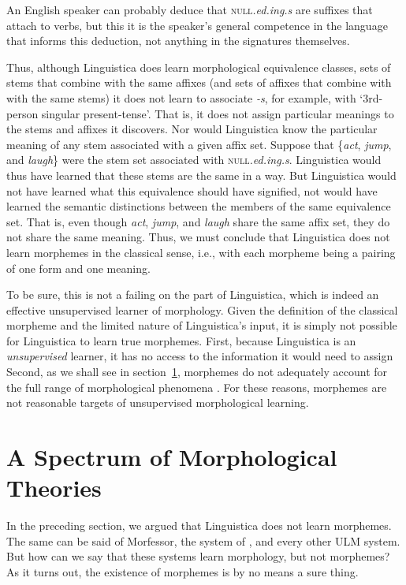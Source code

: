 An English speaker can probably deduce that \textsc{null}\textit{.ed.ing.s} are suffixes that attach to verbs,
but this it is the speaker's general competence in the language that informs this deduction, not anything in the 
signatures themselves.

Thus, although Linguistica does learn morphological equivalence classes, 
sets of stems that combine with the same affixes 
(and sets of affixes that combine with with the same stems) 
it does not learn to associate \textit{-s}, for example, 
with `3rd-person singular present-tense'. That is, it does not assign particular
meanings to the stems and affixes it discovers.
Nor would Linguistica know the particular meaning of any stem 
associated with a given affix set. 
Suppose that \{\textit{act}, \emph{jump}, and \emph{laugh}\} 
were the stem set associated with \textsc{null}\textit{.ed.ing.s}. 
Linguistica would thus have learned that these stems are the same 
in a way. But Linguistica would not have learned what this 
equivalence should have signified, not would have learned the semantic 
distinctions between the members of the same equivalence set. 
That is, even though \textit{act}, \emph{jump}, and \emph{laugh} 
share the same affix set, they do not share the same meaning. 
Thus, we must conclude that Linguistica does not learn morphemes 
in the classical sense, i.e., with each morpheme being a
pairing of one form and one meaning.

To be sure, this is not a failing on the 
part of Linguistica, which is indeed an effective 
unsupervised learner of morphology. Given the definition 
of the classical morpheme and the limited nature of 
Linguistica's input, it is simply not possible for 
Linguistica to learn true morphemes. First, because 
Linguistica is an \emph{unsupervised} learner, it has 
no access to the information it would need to assign 
Second, as we shall see in section~\ref{sec:morpho-theories}, morphemes do not adequately 
account for the full range of morphological phenomena \citep{anderson:2017}. 
For these reasons, morphemes are not reasonable 
targets of unsupervised morphological learning.

\section{A Spectrum of Morphological Theories}
\label{sec:morpho-theories}
In the preceding section, we argued that Linguistica does not learn morphemes. The same can be said of Morfessor, 
the system of \cite{poon-et-al:2009}, and
every other \ac{ULM}  system.
 But how can we say that these systems learn morphology, but not morphemes? As it turns out,
 the existence of morphemes is by no means a sure thing.  

